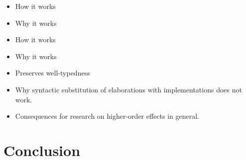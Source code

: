 \documentclass[twoside,a4paper,11pt]{memoir}
\begin{document}
\frontmatter
\thispagestyle{empty}
\maketitle
\makeformaltitlepages{}


\cleardoublepage\tableofcontents
\cleardoublepage\listoffigures
\cleardoublepage\listoftables
\cleardoublepage\mainmatter{}








\begin{itemize}
\item How it works
\item Why it works
\end{itemize}



\begin{itemize}
\item How it works
\item Why it works
\item Preserves well-typedness
\item Why syntactic substitution of elaborations with implementations does not work.
\item Consequences for research on higher-order effects in general.
\end{itemize}

\chapter{Conclusion}

\printbibliography

\appendix
\def\chaptername{Appendix}
\end{document}
